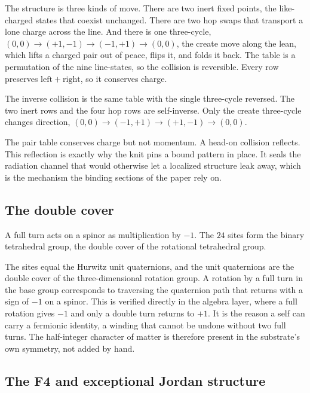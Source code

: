 The structure is three kinds of move. There are two inert fixed points, the like-charged states that coexist unchanged. There are two hop swaps that transport a lone charge across the line. And there is one three-cycle, $(0,0) \to (+1,-1) \to (-1,+1) \to (0,0)$, the create move along the lean, which lifts a charged pair out of peace, flips it, and folds it back. The table is a permutation of the nine line-states, so the collision is reversible. Every row preserves $\mathrm{left} + \mathrm{right}$, so it conserves charge.

\begin{proposition}
The inverse collision is the same table with the single three-cycle reversed. The two inert rows and the four hop rows are self-inverse. Only the create three-cycle changes direction, $(0,0) \to (-1,+1) \to (+1,-1) \to (0,0)$.
\end{proposition}

The pair table conserves charge but not momentum. A head-on collision reflects. This reflection is exactly why the knit pins a bound pattern in place. It seals the radiation channel that would otherwise let a localized structure leak away, which is the mechanism the binding sections of the paper rely on.

\subsection{The double cover}

\begin{theorem}
A full turn acts on a spinor as multiplication by $-1$. The $24$ sites form the binary tetrahedral group, the double cover of the rotational tetrahedral group.
\end{theorem}

The sites equal the Hurwitz unit quaternions, and the unit quaternions are the double cover of the three-dimensional rotation group. A rotation by a full turn in the base group corresponds to traversing the quaternion path that returns with a sign of $-1$ on a spinor. This is verified directly in the algebra layer, where a full rotation gives $-1$ and only a double turn returns to $+1$. It is the reason a self can carry a fermionic identity, a winding that cannot be undone without two full turns. The half-integer character of matter is therefore present in the substrate's own symmetry, not added by hand.

\subsection{The F4 and exceptional Jordan structure}


